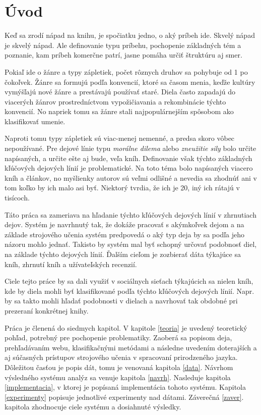 
\chapter{Úvod}

Keď sa zrodí nápad na knihu, je spočiatku jedno, o aký príbeh ide. Skvelý nápad je skvelý nápad. Ale definovanie typu príbehu, pochopenie základných tém a poznanie, kam príbeh komerčne patrí, jasne pomáha určiť štruktúru aj smer.

Pokiaľ ide o žánre a typy zápletiek, počet rôznych druhov sa pohybuje od 1 po čokoľvek. Žánre sa formujú podľa konvencií, ktoré sa časom menia, keďže kultúry vymýšľajú nové žánre a prestávajú používať staré. Diela často zapadajú do viacerých žánrov prostredníctvom vypožičiavania a rekombinácie týchto konvencií. No napriek tomu sa žánre stali najpopulárnejším spôsobom ako klasifikovať umenie.

Naproti tomu typy zápletiek sú viac-menej nemenné, a predsa skoro vôbec nepoužívané. Pre dejové línie typu \textit{morálne dilema} alebo \textit{zneužitie sily} bolo určite napísaných, a určite ešte aj bude, veľa kníh. Definovanie však týchto základných kľúčových dejových línií je problematické. Na toto téma bolo napísaných viacero kníh a článkov, no myšlienky autorov sú veľmi odlišné a nevedia sa zhodnúť ani v tom koľko by ich malo asi byť. Niektorý tvrdia, že ich je 20, iný ich rátajú v tisícoch. 

Táto práca sa zameriava na hľadanie týchto kľúčových dejových línií v zhrnutiach dejov. Systém je navrhnutý tak, že dokáže pracovať s akýmkoľvek dejom a na základe strojového učenia systém predpovedá o aký typ deja by sa podľa jeho názoru mohlo jednať. Takisto by systém mal byť schopný určovať podobnosť diel, na základe týchto dejových línií. Ďalším cieľom je zozbierať dáta týkajúce sa kníh, zhrnutí kníh a užívateľských recenzií.

Ciele tejto práce by sa dali využiť v sociálnych sieťach týkajúcich sa nielen kníh, kde by diela mohli byť klasifikované podľa týchto kľúčových dejových línií. Napr. by sa takto mohli hľadať podobnosti v dielach a navrhovať tak obdobné pri prezeraní konkrétnej knihy.

Práca je členená do siedmych kapitol. V kapitole \ref{teoria} je uvedený teoretický pohľad, potrebný pre pochopenie problematiky. Zaoberá sa popisom deja, prehľadávaním webu, klasifikačnými metódami a následne uvedením doterajších a aj súčasných prístupov strojového učenia v spracovaní prirodzeného jazyka. Dôležitou časťou je popis dát, tomu je venovaná kapitola \ref{data}. Návrhom výsledného systému analýz sa venuje kapitola \ref{navrh}. Nasleduje kapitola \ref{implementacia}, v ktorej je popísaná implementácia tohoto systému. Kapitola \ref{experimenty} popisuje jednotlivé experimenty nad dátami. Záverečná \ref{zaver}. kapitola zhodnocuje ciele systému a dosiahnuté výsledky.

